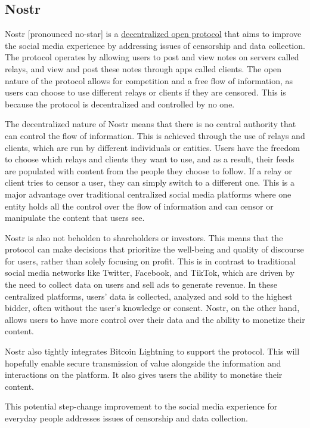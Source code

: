 \subsection{Nostr}
Nostr [pronounced no-star] is a \href{https://www.nostr.how/}{decentralized open protocol} that aims to improve the social media experience by addressing issues of censorship and data collection. The protocol operates by allowing users to post and view notes on servers called relays, and view and post these notes through apps called clients. The open nature of the protocol allows for competition and a free flow of information, as users can choose to use different relays or clients if they are censored. This is because the protocol is decentralized and controlled by no one.\par
The decentralized nature of Nostr means that there is no central authority that can control the flow of information. This is achieved through the use of relays and clients, which are run by different individuals or entities. Users have the freedom to choose which relays and clients they want to use, and as a result, their feeds are populated with content from the people they choose to follow. If a relay or client tries to censor a user, they can simply switch to a different one. This is a major advantage over traditional centralized social media platforms where one entity holds all the control over the flow of information and can censor or manipulate the content that users see.\par
Nostr is also not beholden to shareholders or investors. This means that the protocol can make decisions that prioritize the well-being and quality of discourse for users, rather than solely focusing on profit. This is in contrast to traditional social media networks like Twitter, Facebook, and TikTok, which are driven by the need to collect data on users and sell ads to generate revenue. In these centralized platforms, users' data is collected, analyzed and sold to the highest bidder, often without the user's knowledge or consent. Nostr, on the other hand, allows users to have more control over their data and the ability to monetize their content.\par
Nostr also tightly integrates Bitcoin Lightning to support the protocol. This will hopefully enable secure transmission of value alongside the information and interactions on the platform. It also gives users the ability to monetise their content. \par
This potential step-change improvement to the social media experience for everyday people addresses issues of censorship and data collection. \par
